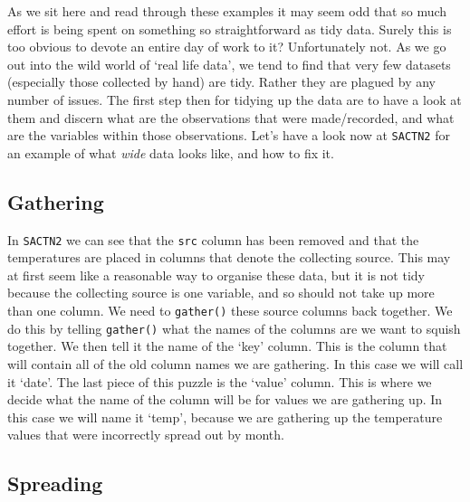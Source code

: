 \documentclass[]{book}
\newenvironment{Shaded}{\begin{snugshade}}{\end{snugshade}}
\newcommand{\KeywordTok}[1]{\textcolor[rgb]{0.13,0.29,0.53}{\textbf{#1}}}
\newcommand{\DataTypeTok}[1]{\textcolor[rgb]{0.13,0.29,0.53}{#1}}
\newcommand{\StringTok}[1]{\textcolor[rgb]{0.31,0.60,0.02}{#1}}
\newcommand{\OperatorTok}[1]{\textcolor[rgb]{0.81,0.36,0.00}{\textbf{#1}}}
\newcommand{\NormalTok}[1]{#1}
\theoremstyle{definition}
\theoremstyle{definition}
\theoremstyle{definition}
\theoremstyle{remark}
\begin{document}
As we sit here and read through these examples it may seem odd that so
much effort is being spent on something so straightforward as tidy data.
Surely this is too obvious to devote an entire day of work to it?
Unfortunately not. As we go out into the wild world of `real life data',
we tend to find that very few datasets (especially those collected by
hand) are tidy. Rather they are plagued by any number of issues. The
first step then for tidying up the data are to have a look at them and
discern what are the observations that were made/recorded, and what are
the variables within those observations. Let's have a look now at
\texttt{SACTN2} for an example of what \emph{wide} data looks like, and
how to fix it.

\subsection{Gathering}\label{gathering}

In \texttt{SACTN2} we can see that the \texttt{src} column has been
removed and that the temperatures are placed in columns that denote the
collecting source. This may at first seem like a reasonable way to
organise these data, but it is not tidy because the collecting source is
one variable, and so should not take up more than one column. We need to
\texttt{gather()} these source columns back together. We do this by
telling \texttt{gather()} what the names of the columns are we want to
squish together. We then tell it the name of the `key' column. This is
the column that will contain all of the old column names we are
gathering. In this case we will call it `date'. The last piece of this
puzzle is the `value' column. This is where we decide what the name of
the column will be for values we are gathering up. In this case we will
name it `temp', because we are gathering up the temperature values that
were incorrectly spread out by month.

\begin{Shaded}
\end{Shaded}

\subsection{Spreading}\label{spreading}
\end{document}
